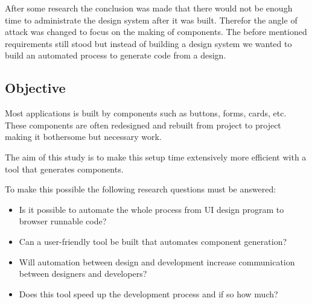 After some research the conclusion was made that there would not be enough time to administrate the design system after it was built. Therefor the angle of attack was changed to focus on the making of components. The before mentioned requirements still stood but instead of building a design system we wanted to build an automated process to generate code from a design. 








\subsection{Objective}
Most applications is built by components such as buttons, forms, cards\cite{babichSimpleDesignTips2020}, etc. These components are often redesigned and rebuilt from project to project making it bothersome but necessary work.


The aim of this study is to make this setup time extensively more efficient with a tool that generates components. 

To make this possible the following research questions must be answered:
\begin{itemize}
  \item Is it possible to automate the whole process from UI design program to browser runnable code? 
  \item Can a user-friendly tool be built that automates component generation?  
  \item Will automation between design and development increase communication between designers and developers?
  \item Does this tool speed up the development process and if so how much?
\end{itemize}



